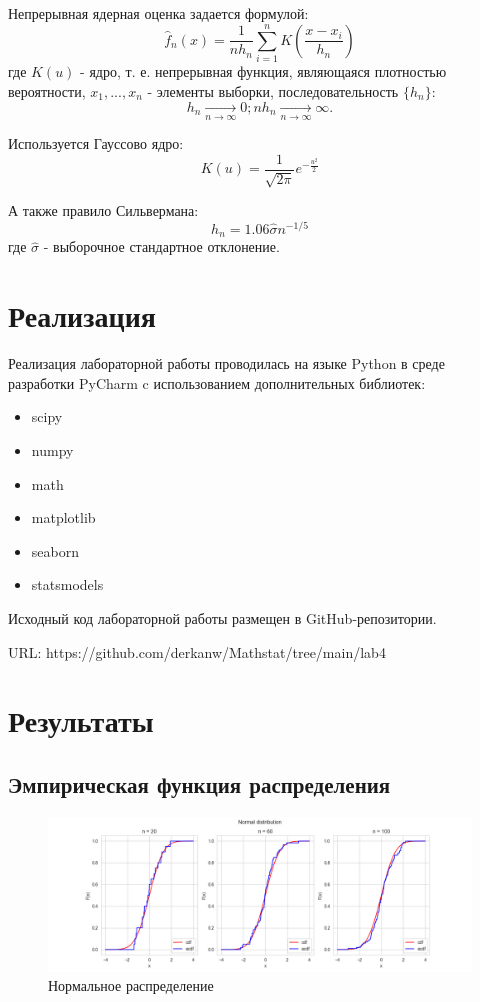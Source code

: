 \documentclass[12pt,a4paper]{article}
\begin{document}
Непрерывная ядерная оценка задается формулой:
\begin{equation}
    \widehat{f}_n(x)=\frac{1}{n h_n}\sum_{i=1}^n{K(\frac{x-x_i}{h_n})}
\end{equation}
где $K(u)$ - ядро, т. е. непрерывная функция, являющаяся плотностью вероятности, $x_1,...,x_n$ - элементы выборки, последовательность $\{h_n\}:$
\begin{equation}
    h_n\xrightarrow[n\to\infty]{}0;
    n h_n\xrightarrow[n\to\infty]{}\infty.
\end{equation}

Используется Гауссово ядро:
\begin{equation}
    K(u)=\frac{1}{\sqrt{2\pi}}e^{-\frac{u^2}{2}}
\end{equation}

А также правило Сильвермана:
\begin{equation}
    h_n=1.06\hat{\sigma}n^{-1/5}
\end{equation}
где $\hat{\sigma}$ - выборочное стандартное отклонение.

\section{Реализация}
Реализация лабораторной работы проводилась на языке Python в среде разработки PyCharm c использованием дополнительных библиотек:
\begin{itemize}
    \item scipy
    \item numpy
    \item math
    \item matplotlib
    \item seaborn
    \item statsmodels
\end{itemize}

Исходный код лабораторной работы размещен в GitHub-репозитории.

URL: https://github.com/derkanw/Mathstat/tree/main/lab4

\section {Результаты}
\subsection{Эмпирическая функция распределения}
\begin{figure}[H]
    \centering
    \includegraphics[scale=0.5]{images/Normal.png}
    \caption{Нормальное распределение}
\end{figure}
\end{document}
